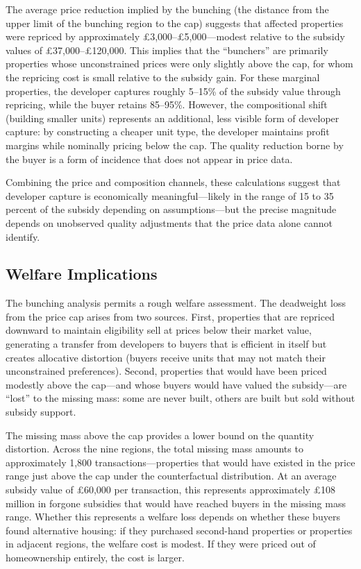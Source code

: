 \documentclass[12pt]{article}
\begin{document}
The average price reduction implied by the bunching (the distance from the upper limit of the bunching region to the cap) suggests that affected properties were repriced by approximately \pounds3,000--\pounds5,000---modest relative to the subsidy values of \pounds37,000--\pounds120,000. This implies that the ``bunchers'' are primarily properties whose unconstrained prices were only slightly above the cap, for whom the repricing cost is small relative to the subsidy gain. For these marginal properties, the developer captures roughly 5--15\% of the subsidy value through repricing, while the buyer retains 85--95\%. However, the compositional shift (building smaller units) represents an additional, less visible form of developer capture: by constructing a cheaper unit type, the developer maintains profit margins while nominally pricing below the cap. The quality reduction borne by the buyer is a form of incidence that does not appear in price data.

Combining the price and composition channels, these calculations suggest that developer capture is economically meaningful---likely in the range of 15 to 35 percent of the subsidy depending on assumptions---but the precise magnitude depends on unobserved quality adjustments that the price data alone cannot identify.

\subsection{Welfare Implications}

The bunching analysis permits a rough welfare assessment. The deadweight loss from the price cap arises from two sources. First, properties that are repriced downward to maintain eligibility sell at prices below their market value, generating a transfer from developers to buyers that is efficient in itself but creates allocative distortion (buyers receive units that may not match their unconstrained preferences). Second, properties that would have been priced modestly above the cap---and whose buyers would have valued the subsidy---are ``lost'' to the missing mass: some are never built, others are built but sold without subsidy support.

The missing mass above the cap provides a lower bound on the quantity distortion. Across the nine regions, the total missing mass amounts to approximately 1,800 transactions---properties that would have existed in the price range just above the cap under the counterfactual distribution. At an average subsidy value of \pounds60,000 per transaction, this represents approximately \pounds108 million in forgone subsidies that would have reached buyers in the missing mass range. Whether this represents a welfare loss depends on whether these buyers found alternative housing: if they purchased second-hand properties or properties in adjacent regions, the welfare cost is modest. If they were priced out of homeownership entirely, the cost is larger.
\end{document}
